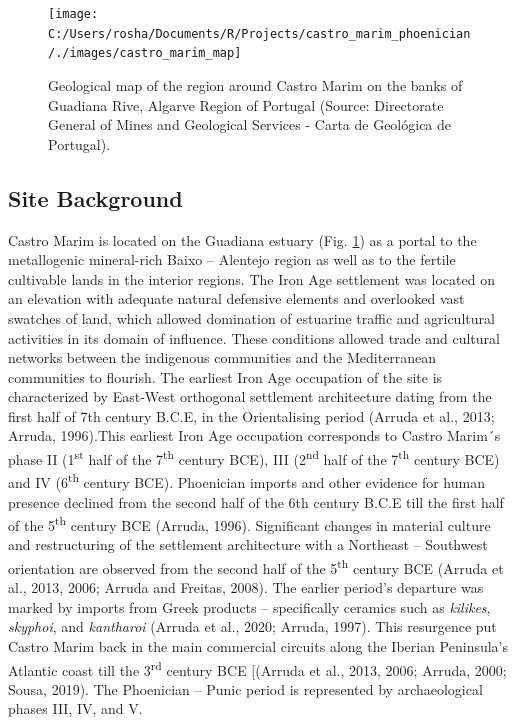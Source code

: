 \documentclass[review]{elsarticle} %
\begin{document}
\begin{figure}
\texttt{[image: C:/Users/rosha/Documents/R/Projects/castro\_marim\_phoenician/./images/castro\_marim\_map]} \caption{Geological map of the region around Castro Marim on the banks of Guadiana Rive, Algarve Region of Portugal (Source: Directorate General of Mines and Geological Services - Carta de Geológica de Portugal).}\label{fig:castro-marim-loc}
\end{figure}

\hypertarget{site-background}{%
\subsection{Site Background}\label{site-background}}

Castro Marim is located on the Guadiana estuary (Fig. \ref{fig:castro-marim-loc}) as a portal to the metallogenic mineral-rich Baixo -- Alentejo region as well as to the fertile cultivable lands in the interior regions. The Iron Age settlement was located on an elevation with adequate natural defensive elements and overlooked vast swatches of land, which allowed domination of estuarine traffic and agricultural activities in its domain of influence. These conditions allowed trade and cultural networks between the indigenous communities and the Mediterranean communities to flourish. The earliest Iron Age occupation of the site is characterized by East-West orthogonal settlement architecture dating from the first half of 7th century B.C.E, in the Orientalising period (Arruda et al., 2013; Arruda, 1996).This earliest Iron Age occupation corresponds to Castro Marim´s phase II (1\textsuperscript{st} half of the 7\textsuperscript{th} century BCE), III (2\textsuperscript{nd} half of the 7\textsuperscript{th} century BCE) and IV (6\textsuperscript{th} century BCE). Phoenician imports and other evidence for human presence declined from the second half of the 6th century B.C.E till the first half of the 5\textsuperscript{th} century BCE (Arruda, 1996). Significant changes in material culture and restructuring of the settlement architecture with a Northeast -- Southwest orientation are observed from the second half of the 5\textsuperscript{th} century BCE (Arruda et al., 2013, 2006; Arruda and Freitas, 2008). The earlier period's departure was marked by imports from Greek products -- specifically ceramics such as \emph{kilikes}, \emph{skyphoi}, and \emph{kantharoi} (Arruda et al., 2020; Arruda, 1997). This resurgence put Castro Marim back in the main commercial circuits along the Iberian Peninsula's Atlantic coast till the 3\textsuperscript{rd} century BCE {[}(Arruda et al., 2013, 2006; Arruda, 2000; Sousa, 2019). The Phoenician -- Punic period is represented by archaeological phases III, IV, and V.
\end{document}
